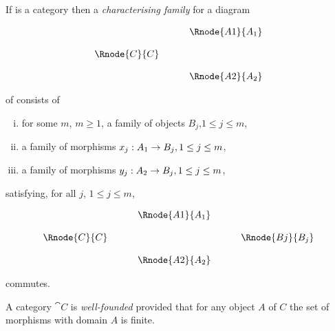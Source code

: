 \documentclass[10pt,a4paper]{article}
\begin{document}
\begin{definition}
\noindent If  is a category  then a \textit{characterising family} for a diagram
\begin{center}
\begin{displaymath}
\begin{array}{cp{0.4cm}c}
            & &\Rnode{A1}{A_1}               \\ [0.4cm]
\Rnode{C}{C}& &                              \\ [0.4cm]
            & &\Rnode{A2}{A_2} 
\end{array}
\end{displaymath}
\end{center}
\noindent of  consists of 
\begin{enumerate} [(i)]
	\item for some $m$, $m \geq 1$, a family of objects $B_j$,$1 \leq j \leq m$,
	\item a family of morphisms $x_j:A_1 \rightarrow B_j, 1 \leq j \leq m$,
	\item a family of morphisms $y_j:A_2 \rightarrow B_j, 1 \leq j \leq m$,
\end{enumerate}
\noindent satisfying, for all $j$, $1 \leq j \leq m$,
\begin{center}
\begin{displaymath}
\begin{array}{cp{0.4cm}cp{0.4cm} c}
            & &\Rnode{A1}{A_1}                  \\ [0.4cm]
\Rnode{C}{C}& &                & & \Rnode{Bj}{B_j} \\ [0.4cm]
            & &\Rnode{A2}{A_2} 
\end{array}
\end{displaymath}
\end{center}
\noindent commutes.
\end{definition}

\begin{definition}
\noindent A category $\cat{C}$ is \textit{well-founded} provided that for 
any object $A$ of $C$ the set of morphisms with domain $A$ is finite. 
\end{definition}
\noindent 
\end{document}
